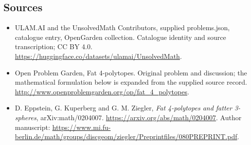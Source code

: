 \documentclass[11pt,a4paper]{article}
\begin{document}
\subsection{Sources}
\begin{itemize}
\item[S1] ULAM.AI and the UnsolvedMath Contributors, supplied problems.json, catalogue entry, OpenGarden collection. Catalogue identity and source transcription; CC BY 4.0.
\url{https://huggingface.co/datasets/ulamai/UnsolvedMath}.
\item[S2] Open Problem Garden, Fat 4-polytopes. Original problem and discussion; the mathematical formulation below is expanded from the supplied source record.
\url{http://www.openproblemgarden.org/op/fat_4_polytopes}.
\item[A1] D. Eppstein, G. Kuperberg and G. M. Ziegler, \emph{Fat 4-polytopes and fatter 3-spheres}, arXiv:math/0204007. \url{https://arxiv.org/abs/math/0204007}. Author manuscript: \url{https://www.mi.fu-berlin.de/math/groups/discgeom/ziegler/Preprintfiles/080PREPRINT.pdf}.
\end{itemize}
\end{document}
